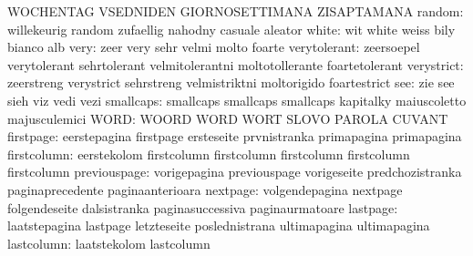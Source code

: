                            WOCHENTAG                 VSEDNIDEN
                           GIORNOSETTIMANA           ZISAPTAMANA
                   random: willekeurig               random
                           zufaellig                 nahodny
                           casuale                   aleator
                    white: wit                       white
                           weiss                     bily
                           bianco                    alb
                     very: zeer                      very
                           sehr                      velmi
                           molto                     foarte
             verytolerant: zeersoepel                verytolerant
                           sehrtolerant              velmitolerantni
                           moltotollerante           foartetolerant
               verystrict: zeerstreng                verystrict
                           sehrstreng                velmistriktni
                           moltorigido               foartestrict %
                      see: zie                       see
                           sieh                      viz
                           vedi                      vezi
                smallcaps: smallcaps                 smallcaps
                           smallcaps                 kapitalky
                           maiuscoletto              majusculemici
                     WORD: WOORD                     WORD
                           WORT                      SLOVO
                           PAROLA                    CUVANT
                firstpage: eerstepagina              firstpage
                           ersteseite                prvnistranka
                           primapagina               primapagina
              firstcolumn: eerstekolom               firstcolumn
                           firstcolumn               firstcolumn
                           firstcolumn               firstcolumn
             previouspage: vorigepagina              previouspage
                           vorigeseite               predchozistranka
                           paginaprecedente          paginaanterioara
                 nextpage: volgendepagina            nextpage
                           folgendeseite             dalsistranka
                           paginasuccessiva          paginaurmatoare
                 lastpage: laatstepagina             lastpage
                           letzteseite               poslednistrana
                           ultimapagina              ultimapagina
               lastcolumn: laatstekolom              lastcolumn
